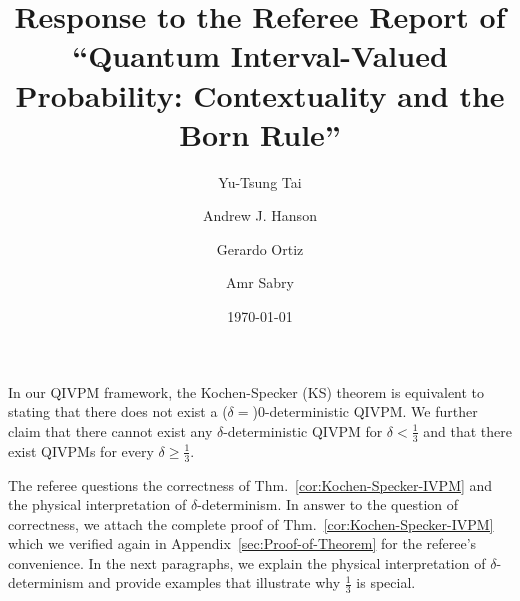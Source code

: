\documentclass[english,reprint, aps, prl,superscriptaddress, showpacs,
showkeys, longbibliography, amsmath, amssymb, floatfix]{revtex4-1}
\theoremstyle{plain}
\theoremstyle{definition}
\begin{document}
\title{Response to the Referee Report of ``Quantum Interval-Valued Probability:
Contextuality and the Born Rule''}

\author{Yu-Tsung Tai}



\author{Andrew J. Hanson}


\author{Gerardo Ortiz}


\author{Amr Sabry}


\date{\today}

\maketitle

In our QIVPM framework, the Kochen-Specker (KS) theorem is equivalent
to stating that there does not exist a ($\delta=$)$0$-deterministic
QIVPM. We further claim that there cannot exist any $\delta$-deterministic
QIVPM for $\delta<\frac{1}{3}$ and that there exist QIVPMs for every
$\delta\ge\frac{1}{3}$.

The referee questions the correctness of Thm.~\ref{cor:Kochen-Specker-IVPM}
and the physical interpretation of $\delta$-determinism. In answer
to the question of correctness, we attach the complete proof of Thm.~\ref{cor:Kochen-Specker-IVPM}
which we verified again in Appendix~\ref{sec:Proof-of-Theorem} for
the referee's convenience. In the next paragraphs, we explain the
physical interpretation of $\delta$-determinism and provide examples
that illustrate why $\frac{1}{3}$ is special.
\end{document}
